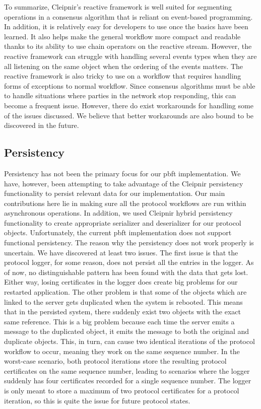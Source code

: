 To summarize, Cleipnir’s reactive framework is well suited for segmenting operations in a consensus algorithm that is reliant on event-based programming. In addition, it is relatively easy for developers to use once the basics have been learned. It also helps make the general workflow more compact and readable thanks to its ability to use chain operators on the reactive stream. However, the reactive framework can struggle with handling several events types when they are all listening on the same  object when the ordering of the events matters. The reactive framework is also tricky to use on a workflow that requires handling forms of exceptions to normal workflow. Since consensus algorithms must be able to handle situations where parties in the network stop responding, this can become a frequent issue. However, there do exist workarounds for handling some of the issues discussed.  We believe that better workarounds are also bound to be discovered in the future. 

\subsection{Persistency}
Persistency has not been the primary focus for our \ac{pbft} implementation. We have, however, been attempting to take advantage of the Cleipnir persistency functionality to persist relevant data for our implementation. Our main contributions here lie in making sure all the protocol workflows are run within  asynchronous operations. In addition, we used Cleipnir hybrid persistency functionality to create appropriate serializer and deserializer for our protocol objects.
Unfortunately, the current \ac{pbft} implementation does not support functional persistency. The reason why the persistency does not work properly is uncertain. We have discovered at least two issues. The first issue is that the protocol logger, for some reason, does not persist all the entries in the logger. As of now, no distinguishable pattern has been found with the data that gets lost. Either way, losing certificates in the logger does create big problems for our restarted application. The other problem is that some of the  objects which are linked to the server gets duplicated when the system is rebooted. This means that in the persisted system, there suddenly exist two  objects with the exact same reference. This is a big problem because each time the server emits a message to the duplicated  object, it emits the message to both the original and duplicate  objects. This, in turn, can cause two identical iterations of the protocol workflow to occur, meaning they work on the same sequence number. In the worst-case scenario, both protocol iterations store the resulting protocol certificates on the same sequence number, leading to scenarios where the logger suddenly has four certificates recorded for a single sequence number. The logger is only meant to store a maximum of two protocol certificates for a protocol iteration, so this is quite the issue for future protocol states.

